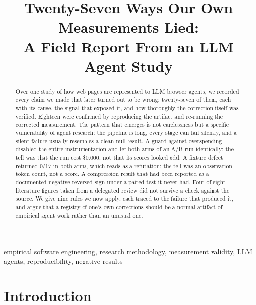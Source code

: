 \documentclass[conference]{IEEEtran}
\begin{document}
\title{Twenty-Seven Ways Our Own Measurements Lied:\\A Field Report From an LLM Agent Study}

\author{
}

\maketitle

\begin{abstract}
Over one study of how web pages are represented to LLM browser agents, we
recorded every claim we made that later turned out to be wrong: twenty-seven of
them, each with its cause, the signal that exposed it, and how thoroughly the
correction itself was verified. Eighteen were confirmed by reproducing the
artifact and re-running the corrected measurement. The pattern that emerges is
not carelessness but a specific vulnerability of agent research: the pipeline
is long, every stage can fail silently, and a silent failure usually resembles
a clean null result. A guard against overspending disabled the entire
instrumentation and let both arms of an A/B run identically; the tell was that
the run cost \$0.000, not that its scores looked odd. A fixture defect returned
0/17 in both arms, which reads as a refutation; the tell was an observation
token count, not a score. A compression result that had been reported as a
documented negative reversed sign under a paired test it never had. Four of
eight literature figures taken from a delegated review did not survive a check
against the source. We give nine rules we now apply, each traced to the failure
that produced it, and argue that a registry of one's own corrections should be a
normal artifact of empirical agent work rather than an unusual one.
\end{abstract}

\begin{IEEEkeywords}
empirical software engineering, research methodology, measurement validity,
LLM agents, reproducibility, negative results
\end{IEEEkeywords}

\section{Introduction}
\end{document}
